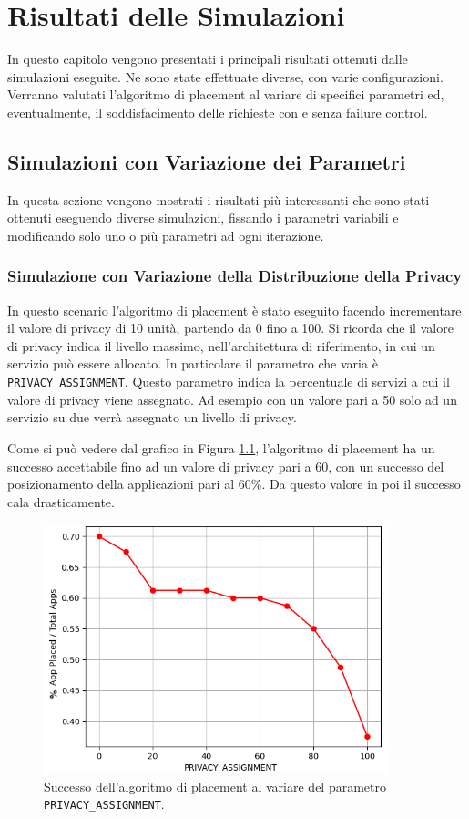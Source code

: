 \chapter{Risultati delle Simulazioni}

In questo capitolo vengono presentati i principali risultati ottenuti dalle simulazioni eseguite. Ne sono state effettuate diverse, con varie configurazioni. Verranno valutati l'algoritmo di placement al variare di specifici parametri ed, eventualmente, il soddisfacimento delle richieste con e senza failure control.

\section{Simulazioni con Variazione dei Parametri}

In questa sezione vengono mostrati i risultati più interessanti che sono stati ottenuti eseguendo diverse simulazioni, fissando i parametri variabili e modificando solo uno o più parametri ad ogni iterazione.

\subsection{Simulazione con Variazione della Distribuzione della Privacy}

In questo scenario l'algoritmo di placement è stato eseguito facendo incrementare il valore di privacy di 10 unità, partendo da 0 fino a 100. Si ricorda che il valore di privacy indica il livello massimo, nell'architettura di riferimento, in cui un servizio può essere allocato. In particolare il parametro che varia è \texttt{PRIVACY\_ASSIGNMENT}. Questo parametro indica la percentuale di servizi a cui il valore di privacy viene assegnato. Ad esempio con un valore pari a 50 solo ad un servizio su due verrà assegnato un livello di privacy.

Come si può vedere dal grafico in Figura \ref{fig:privacy_placement_success}, l'algoritmo di placement ha un successo accettabile fino ad un valore di privacy pari a 60, con un successo del posizionamento della applicazioni pari al $60\%$. Da questo valore in poi il successo cala drasticamente.

\begin{figure}[!ht]
  \includegraphics[width=10cm]{images/privacy_placement_success}
  \centering
  \caption{Successo dell'algoritmo di placement al variare del parametro \texttt{PRIVACY\_ASSIGNMENT}.}
  \label{fig:privacy_placement_success}
\end{figure}

